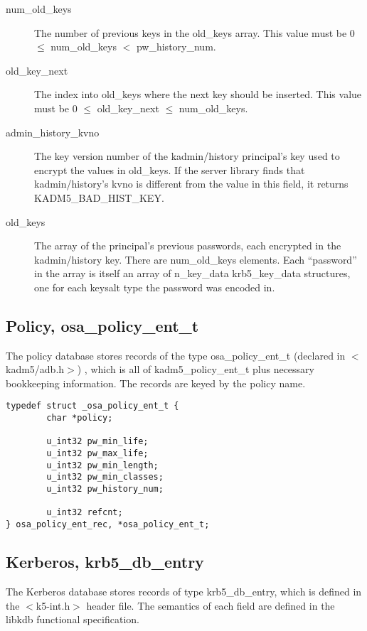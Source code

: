 \begin{description}
\item[num_old_keys] The number of previous keys in the old_keys array.
This value must be 0 $\le$ num_old_keys $<$ pw_history_num.

\item[old_key_next] The index into old_keys where the next key should
be inserted.  This value must be 0 $\le$ old_key_next $\le$
num_old_keys.

\item[admin_history_kvno] The key version number of the kadmin/history
principal's key used to encrypt the values in old_keys.  If the server
library finds that kadmin/history's kvno is different from the value
in this field, it returns KADM5_BAD_HIST_KEY.

\item[old_keys] The array of the principal's previous passwords, each
encrypted in the kadmin/history key.  There are num_old_keys
elements.  Each ``password'' in the array is itself an array of
n_key_data krb5_key_data structures, one for each keysalt type the
password was encoded in.
\end{description}

\subsection{Policy, osa_policy_ent_t}

The policy database stores records of the type osa_policy_ent_t
(declared in $<$kadm5/adb.h$>$) , which is all of
kadm5_policy_ent_t plus necessary bookkeeping information.  The
records are keyed by the policy name.

\begin{verbatim}
typedef struct _osa_policy_ent_t {
        char *policy;

        u_int32 pw_min_life;
        u_int32 pw_max_life;
        u_int32 pw_min_length;
        u_int32 pw_min_classes;
        u_int32 pw_history_num;

        u_int32 refcnt;
} osa_policy_ent_rec, *osa_policy_ent_t;
\end{verbatim}

\subsection{Kerberos, krb5_db_entry}

The Kerberos database stores records of type krb5_db_entry, which is
defined in the $<$k5-int.h$>$ header file.  The semantics of each
field are defined in the libkdb functional specification.

